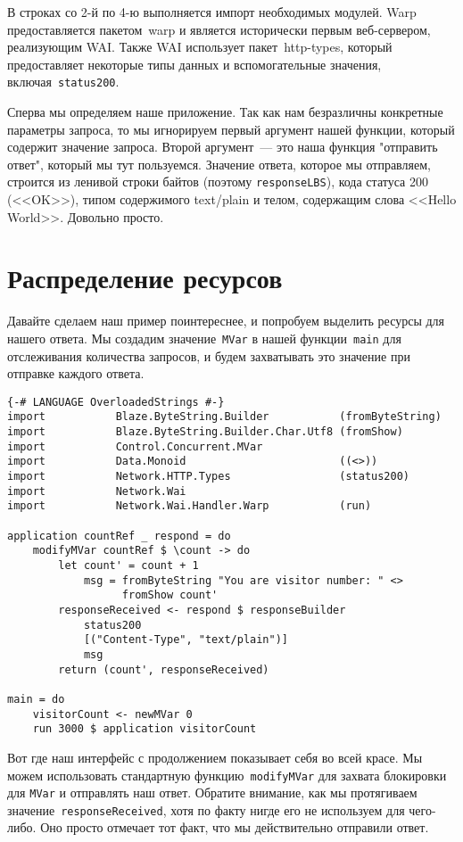 В строках со 2-й по 4-ю выполняется импорт необходимых модулей. Warp
предоставляется пакетом~warp и является исторически первым веб-сервером,
реализующим WAI. Также WAI использует пакет~http-types, который предоставляет
некоторые типы данных и вспомогательные значения,
включая~\lstinline!status200!.

Сперва мы определяем наше приложение. Так как нам безразличны конкретные
параметры запроса, то мы игнорируем первый аргумент нашей функции, который
содержит значение запроса. Второй аргумент~--- это наша функция "отправить
ответ", который мы тут пользуемся. Значение ответа, которое мы отправляем,
строится из ленивой строки байтов (поэтому \lstinline'responseLBS'), кода
статуса 200 (<<OK>>), типом содержимого text/plain и телом, содержащим слова
<<Hello World>>. Довольно просто.

\section{Распределение ресурсов}
Давайте сделаем наш пример поинтереснее, и попробуем выделить ресурсы для
нашего ответа. Мы создадим значение~\lstinline'MVar' в нашей
функции~\lstinline'main' для отслеживания количества запросов, и будем
захватывать это значение при отправке каждого ответа.
\begin{lstlisting}
{-# LANGUAGE OverloadedStrings #-}
import           Blaze.ByteString.Builder           (fromByteString)
import           Blaze.ByteString.Builder.Char.Utf8 (fromShow)
import           Control.Concurrent.MVar
import           Data.Monoid                        ((<>))
import           Network.HTTP.Types                 (status200)
import           Network.Wai
import           Network.Wai.Handler.Warp           (run)

application countRef _ respond = do
    modifyMVar countRef $ \count -> do
        let count' = count + 1
            msg = fromByteString "You are visitor number: " <>
                  fromShow count'
        responseReceived <- respond $ responseBuilder
            status200
            [("Content-Type", "text/plain")]
            msg
        return (count', responseReceived)

main = do
    visitorCount <- newMVar 0
    run 3000 $ application visitorCount
\end{lstlisting}

Вот где наш интерфейс с продолжением показывает себя во всей красе. Мы можем
использовать стандартную функцию~\lstinline'modifyMVar' для захвата блокировки
для \lstinline'MVar' и отправлять наш ответ. Обратите внимание, как мы
протягиваем значение~\lstinline'responseReceived', хотя по факту нигде его не
используем для чего-либо. Оно просто отмечает тот факт, что мы действительно
отправили ответ.

